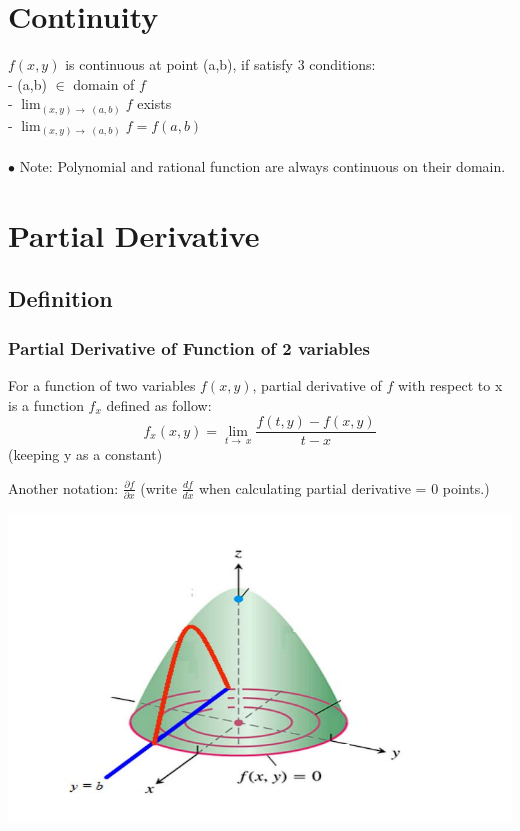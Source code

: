 \documentclass[12pt]{article}
\begin{document}
\section{Continuity}

$f(x,y)$ is continuous at point (a,b), if satisfy 3 conditions: \\
- (a,b) $\in$ domain of $f$\\
- $\lim_{(x,y) \to \ (a,b)} f$ exists\\
- $\lim_{(x,y) \to \ (a,b)} f = f(a,b)$\\
\\
$\bullet$ Note: Polynomial and rational function are always continuous on their domain. 

 \section{Partial Derivative}
 \subsection{Definition}
 \subsubsection{Partial Derivative of Function of 2 variables}
 \begin{mybox}
    For a function of two variables $f(x,y)$, partial derivative of $f$ with respect to x is a function $f_x$ defined as follow:
    $$f_x (x,y) = \lim_{t \to \ x} \frac{f(t,y) - f(x,y)}{t-x}$$
    (keeping y as a constant)
    
\end{mybox}
 Another notation: $\frac{\partial f}{\partial x}$ (write $\frac{df}{dx}$ when calculating partial derivative = 0 points.)
 \begin{center}
     \includegraphics[scale =0.5]{7.png}
 \end{center}
 
\end{document}
